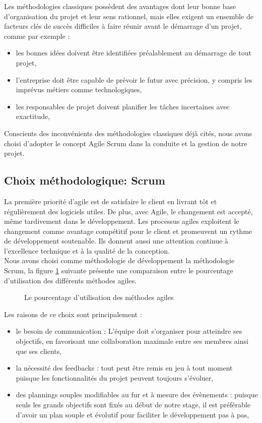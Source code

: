     \label{table:avsc}

Les méthodologies classiques possèdent des avantages dont leur bonne base d’organisation du projet et leur sens rationnel, mais elles exigent un ensemble de facteurs clés de succès difficiles à faire réunir avant le démarrage d’un projet, comme par exemple :
\begin{itemize}
    \item les bonnes idées doivent être identifiées préalablement au démarrage de tout projet,
    \item l'entreprise doit être capable de prévoir le futur avec précision, y compris les imprévus métiers comme technologiques,
    \item les responsables de projet doivent planifier les tâches incertaines avec exactitude,
\end{itemize}
Conscients des inconvénients des méthodologies classiques déjà cités, nous avons choisi d’adopter le concept Agile Scrum dans la conduite et la gestion de notre projet.
\subsection{Choix méthodologique: Scrum}
La première priorité d’agile est de satisfaire le client en livrant tôt et régulièrement des logiciels utiles. De plus, avec Agile, le changement est accepté, même tardivement dans le développement. Les processus agiles exploitent le changement comme avantage compétitif pour le client et promeuvent un rythme de développement soutenable.  Ils donnent aussi une attention continue à l'excellence technique et à la qualité de la conception.\\
Nous avons choisi comme méthodologie de développement la méthodologie Scrum, la figure \ref{fig:su} \cite{scrumvsall} suivante présente une comparaison entre le pourcentage d'utilisation des différents méthodes agiles.

\begin{figure}[htpb]
\centering
{}
\caption{Le pourcentage d'utilisation des méthodes agiles}
\label{fig:su}
\end{figure}
\newpage
Les raisons de ce choix sont principalement :
\begin{itemize}
    \item le besoin de communication : L’équipe doit s’organiser pour atteindre ses objectifs, en favorisant une collaboration maximale entre ses membres ainsi que ses clients,
    \item la nécessité des feedbacks : tout peut être remis en jeu à tout moment puisque les fonctionnalités du projet peuvent toujours s’évoluer,
    \item des plannings souples modifiables au fur et à mesure des évènements : puisque seuls les grands objectifs sont fixés au début de notre stage, il est préférable d’avoir un plan souple et évolutif pour faciliter le développement pas à pas,
\end{itemize}

